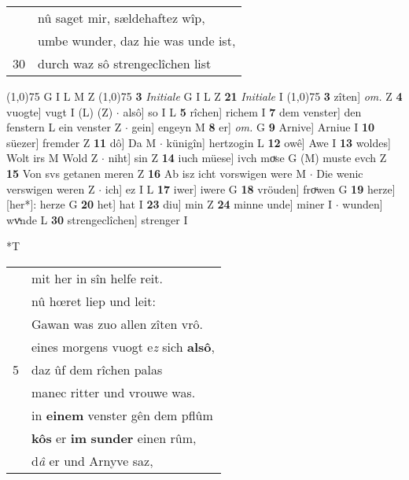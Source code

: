 \documentclass[8pt,a4paper,notitlepage]{article}
\begin{document}
\begin{table}[ht]
\begin{minipage}[t]{0.5\linewidth}
\begin{tabular}{rl}
 & nû saget mir, sældehaftez wîp,\\ 
 & umbe wunder, daz hie was unde ist,\\ 
30 & durch waz sô strengeclîchen list\\ 
\end{tabular}
\scriptsize
\line(1,0){75} \newline
G I L M Z \newline
\line(1,0){75} \newline
\textbf{3} \textit{Initiale} G I L Z  \textbf{21} \textit{Initiale} I  \newline
\line(1,0){75} \newline
\textbf{3} zîten] \textit{om.} Z \textbf{4} vuogte] vugt I (L) (Z)  $\cdot$ alsô] so I L \textbf{5} rîchen] richem I \textbf{7} dem venster] den fenstern L ein venster Z  $\cdot$ gein] engeyn M \textbf{8} er] \textit{om.} G \textbf{9} Arnive] Arniue I \textbf{10} süezer] fremder Z \textbf{11} dô] Da M  $\cdot$ künigîn] hertzogin L \textbf{12} owê] Awe I \textbf{13} woldes] Wolt irs M Wold Z  $\cdot$ niht] sin Z \textbf{14} iuch müese] ivch moͮse G (M) muste evch Z \textbf{15} Von svs getanen meren Z \textbf{16} Ab isz icht vorswigen were M  $\cdot$ Die wenic verswigen weren Z  $\cdot$ ich] ez I L \textbf{17} iwer] iwere G \textbf{18} vröuden] froͮwen G \textbf{19} herze] [her*]: herze G \textbf{20} het] hat I \textbf{23} diu] min Z \textbf{24} minne unde] miner I  $\cdot$ wunden] wvͯnde L \textbf{30} strengeclîchen] strenger I \newline
\end{minipage}
\hspace{0.5cm}
\begin{minipage}[t]{0.5\linewidth}
\small
\begin{center}*T
\end{center}
\begin{tabular}{rl}
 & mit her in sîn helfe reit.\\ 
 & nû hœret liep und leit:\\ 
 & Gawan was zuo allen zîten vrô.\\ 
 & eines morgens vuogt e\textit{z} sich \textbf{alsô},\\ 
5 & daz ûf dem rîchen palas\\ 
 & manec ritter und vrouwe was.\\ 
 & in \textbf{einem} venster gên dem pflûm\\ 
 & \textbf{kôs} er \textbf{im} \textbf{sunder} einen rûm,\\ 
 & d\textit{â} er und Arnyve saz,\\ 

\end{tabular}
\end{minipage}
\end{table}
\end{document}
